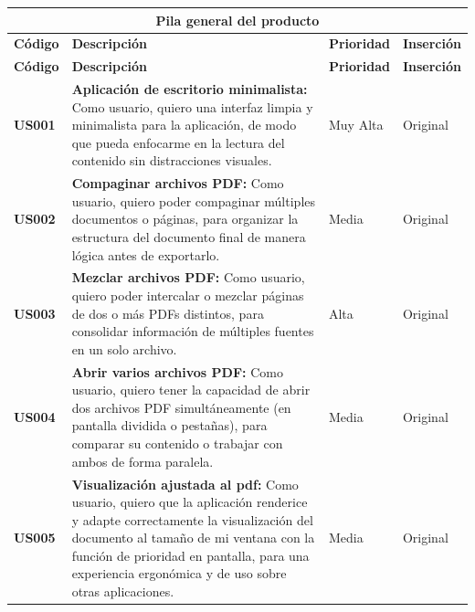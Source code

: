 \begin{longtable}{|l||p{7cm}|l|l|}

\multicolumn{4}{c}{Pila general del producto}\\
\hline\hline
\textbf{Código} & \textbf{Descripción} & \textbf{Prioridad} & \textbf{Inserción}\\
\hline
\endfirsthead
\textbf{Código} & \textbf{Descripción} & \textbf{Prioridad} & \textbf{Inserción}\\
\hline\hline
\endhead




\textbf{US001} & 
\textbf{Aplicación de escritorio minimalista:} Como usuario, quiero una interfaz limpia y minimalista para la aplicación, de modo que pueda enfocarme en la lectura del contenido sin distracciones visuales. & Muy Alta & Original\\

\textbf{US002} & 
\textbf{Compaginar archivos PDF:} Como usuario, quiero poder compaginar múltiples documentos o páginas, para organizar la estructura del documento final de manera lógica antes de exportarlo. & Media & Original\\

\textbf{US003} & 
\textbf{Mezclar archivos PDF:} Como usuario, quiero poder intercalar o mezclar páginas de dos o más PDFs distintos, para consolidar información de múltiples fuentes en un solo archivo. & Alta & Original\\

\textbf{US004} & 
\textbf{Abrir varios archivos PDF:} Como usuario, quiero tener la capacidad de abrir dos archivos PDF simultáneamente (en pantalla dividida o pestañas), para comparar su contenido o trabajar con ambos de forma paralela. & Media & Original\\

\textbf{US005} & 
\textbf{Visualización ajustada al pdf:} Como usuario, quiero que la aplicación renderice y adapte correctamente la visualización del documento al tamaño de mi ventana con la función de prioridad en pantalla, para una experiencia ergonómica y de uso sobre otras aplicaciones. & Media & Original\\


\end{longtable}
